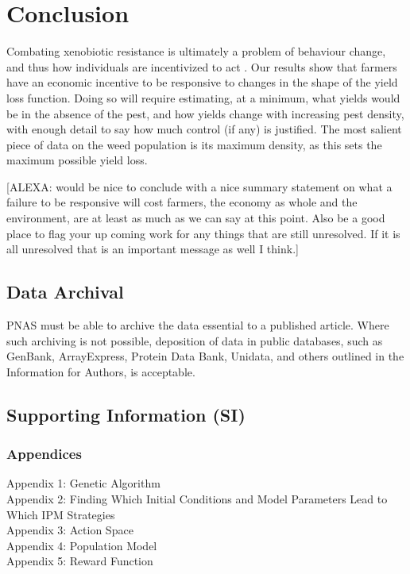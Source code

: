 \documentclass[9pt,twocolumn,twoside,lineno]{pnas-new}
\begin{document}
\section*{Conclusion}
Combating xenobiotic resistance is ultimately a problem of behaviour change, and thus how individuals are incentivized to act \citep{Hurl2016}. Our results show that farmers have an economic incentive to be responsive to changes in the shape of the yield loss function. Doing so will require estimating, at a minimum, what yields would be in the absence of the pest, and how yields change with increasing pest density, with enough detail to say how much control (if any) is justified. The most salient piece of data on the weed population is its maximum density, as this sets the maximum possible yield loss.      

[ALEXA: would be nice to conclude with a nice summary statement on what a failure to be responsive will cost farmers, the economy as whole and the environment, are at least as much as we can say at this point. Also be a good place to flag your up coming work for any things that are still unresolved. If it is all unresolved that is an important message as well I think.] 

\subsection*{Data Archival}

PNAS must be able to archive the data essential to a published article. Where such archiving is not possible, deposition of data in public databases, such as GenBank, ArrayExpress, Protein Data Bank, Unidata, and others outlined in the Information for Authors, is acceptable.

\subsection*{Supporting Information (SI)}
\subsubsection*{Appendices}
Appendix 1: Genetic Algorithm\\
Appendix 2: Finding Which Initial Conditions and Model Parameters Lead to Which IPM Strategies\\
Appendix 3: Action Space\\
Appendix 4: Population Model\\
Appendix 5: Reward Function\\
\end{document}
